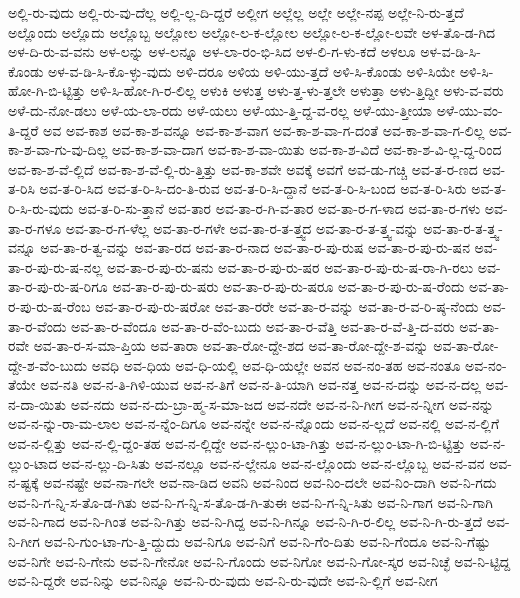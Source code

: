 {ಅಲ್ಲಿ-ರು-ವುದು
ಅಲ್ಲಿ-ರು-ವು-ದೆಲ್ಲ
ಅಲ್ಲಿ-ಲ್ಲ-ದಿ-ದ್ದರೆ
ಅಲ್ಲೀಗ
ಅಲ್ಲೆಲ್ಲ
ಅಲ್ಲೇ
ಅಲ್ಲೇ-ನಪ್ಪ
ಅಲ್ಲೇ-ನಿ-ರು-ತ್ತದೆ
ಅಲ್ಲೊಂದು
ಅಲ್ಲೊದು
ಅಲ್ಲೊಬ್ಬ
ಅಲ್ಲೋಲ
ಅಲ್ಲೋ-ಲ-ಕ-ಲ್ಲೋಲ
ಅಲ್ಲೋ-ಲ-ಕ-ಲ್ಲೋ-ಲವೇ
ಅಳ-ತೊ-ಡ-ಗಿದ
ಅಳ-ದಿ-ರು-ವ-ವನು
ಅಳ-ಲನ್ನು
ಅಳ-ಲನ್ನೂ
ಅಳ-ಲಾ-ರಂ-ಭಿ-ಸಿದ
ಅಳ-ಲಿ-ಗ-ಳು-ಕದೆ
ಅಳಲೂ
ಅಳ-ವ-ಡಿ-ಸಿ-ಕೊಂಡು
ಅಳ-ವ-ಡಿ-ಸಿ-ಕೊ-ಳ್ಳು-ವುದು
ಅಳಿ-ದರೂ
ಅಳಿಯ
ಅಳಿ-ಯು-ತ್ತದೆ
ಅಳಿ-ಸಿ-ಕೊಂಡು
ಅಳಿ-ಸಿಯೇ
ಅಳಿ-ಸಿ-ಹೋ-ಗಿ-ಬಿ-ಟ್ಟಿತ್ತು
ಅಳಿ-ಸಿ-ಹೋ-ಗಿ-ರ-ಲಿಲ್ಲ
ಅಳುಕಿ
ಅಳುತ್ತ
ಅಳು-ತ್ತ-ಳು-ತ್ತಲೇ
ಅಳುತ್ತಾ
ಅಳು-ತ್ತಿದ್ದೀ
ಅಳು-ವ-ವರು
ಅಳೆ-ದು-ನೋ-ಡಲು
ಅಳೆ-ಯ-ಲಾ-ರದು
ಅಳೆ-ಯಲು
ಅಳೆ-ಯು-ತ್ತಿ-ದ್ದ-ವ-ರಲ್ಲ
ಅಳೆ-ಯು-ತ್ತೀಯಾ
ಅಳೆ-ಯು-ವಂ-ತಿ-ದ್ದರೆ
ಅವ
ಅವ-ಕಾಶ
ಅವ-ಕಾ-ಶ-ವನ್ನೂ
ಅವ-ಕಾ-ಶ-ವಾಗ
ಅವ-ಕಾ-ಶ-ವಾ-ಗ-ದಂತೆ
ಅವ-ಕಾ-ಶ-ವಾ-ಗ-ಲಿಲ್ಲ
ಅವ-ಕಾ-ಶ-ವಾ-ಗು-ವು-ದಿಲ್ಲ
ಅವ-ಕಾ-ಶ-ವಾ-ದಾಗ
ಅವ-ಕಾ-ಶ-ವಾ-ಯಿತು
ಅವ-ಕಾ-ಶ-ವಿದೆ
ಅವ-ಕಾ-ಶ-ವಿ-ಲ್ಲ-ದ್ದ-ರಿಂದ
ಅವ-ಕಾ-ಶ-ವೆ-ಲ್ಲಿದೆ
ಅವ-ಕಾ-ಶ-ವೆ-ಲ್ಲಿ-ರು-ತ್ತಿತ್ತು
ಅವ-ಕಾ-ಶವೇ
ಅವಕ್ಕೆ
ಅವಗೆ
ಅವ-ಡು-ಗಚ್ಚಿ
ಅವ-ತ-ರ-ಣದ
ಅವ-ತ-ರಿಸಿ
ಅವ-ತ-ರಿ-ಸಿದ
ಅವ-ತ-ರಿ-ಸಿ-ದಂ-ತಿ-ರುವ
ಅವ-ತ-ರಿ-ಸಿ-ದ್ದಾನೆ
ಅವ-ತ-ರಿ-ಸಿ-ಬಂದ
ಅವ-ತ-ರಿ-ಸಿರು
ಅವ-ತ-ರಿ-ಸಿ-ರು-ವುದು
ಅವ-ತ-ರಿ-ಸು-ತ್ತಾನೆ
ಅವ-ತಾರ
ಅವ-ತಾ-ರ-ಗಿ-ವ-ತಾರ
ಅವ-ತಾ-ರ-ಗ-ಳಾದ
ಅವ-ತಾ-ರ-ಗಳು
ಅವ-ತಾ-ರ-ಗಳೂ
ಅವ-ತಾ-ರ-ಗ-ಳೆಲ್ಲ
ಅವ-ತಾ-ರ-ಗಳೇ
ಅವ-ತಾ-ರ-ತ-ತ್ತ್ವದ
ಅವ-ತಾ-ರ-ತ-ತ್ತ್ವ-ವನ್ನು
ಅವ-ತಾ-ರ-ತ-ತ್ತ್ವ-ವನ್ನೂ
ಅವ-ತಾ-ರ-ತ್ವ-ವನ್ನು
ಅವ-ತಾ-ರದ
ಅವ-ತಾ-ರ-ನಾದ
ಅವ-ತಾ-ರ-ಪು-ರುಷ
ಅವ-ತಾ-ರ-ಪು-ರು-ಷನ
ಅವ-ತಾ-ರ-ಪು-ರು-ಷ-ನಲ್ಲ
ಅವ-ತಾ-ರ-ಪು-ರು-ಷನು
ಅವ-ತಾ-ರ-ಪು-ರು-ಷರ
ಅವ-ತಾ-ರ-ಪು-ರು-ಷ-ರಾ-ಗಿ-ರಲು
ಅವ-ತಾ-ರ-ಪು-ರು-ಷ-ರಿಗೂ
ಅವ-ತಾ-ರ-ಪು-ರು-ಷರು
ಅವ-ತಾ-ರ-ಪು-ರು-ಷರೂ
ಅವ-ತಾ-ರ-ಪು-ರು-ಷ-ರೆಂದು
ಅವ-ತಾ-ರ-ಪು-ರು-ಷ-ರೆಂಬ
ಅವ-ತಾ-ರ-ಪು-ರು-ಷರೋ
ಅವ-ತಾ-ರರೇ
ಅವ-ತಾ-ರ-ವನ್ನು
ಅವ-ತಾ-ರ-ವ-ರಿ-ಷ್ಠ-ನೆಂದು
ಅವ-ತಾ-ರ-ವೆಂದು
ಅವ-ತಾ-ರ-ವೆಂದೂ
ಅವ-ತಾ-ರ-ವೆಂ-ಬುದು
ಅವ-ತಾ-ರ-ವೆತ್ತಿ
ಅವ-ತಾ-ರ-ವೆ-ತ್ತಿ-ದ-ವರು
ಅವ-ತಾ-ರವೇ
ಅವ-ತಾ-ರ-ಸ-ಮಾ-ಪ್ತಿಯ
ಅವ-ತಾರಾ
ಅವ-ತಾ-ರೋ-ದ್ದೇ-ಶದ
ಅವ-ತಾ-ರೋ-ದ್ದೇ-ಶ-ವನ್ನು
ಅವ-ತಾ-ರೋ-ದ್ದೇ-ಶ-ವೆಂ-ಬುದು
ಅವಧಿ
ಅವ-ಧಿಯ
ಅವ-ಧಿ-ಯಲ್ಲಿ
ಅವ-ಧಿ-ಯಲ್ಲೇ
ಅವನ
ಅವ-ನಂ-ತಹ
ಅವ-ನಂತೂ
ಅವ-ನಂ-ತೆಯೇ
ಅವ-ನತಿ
ಅವ-ನ-ತಿ-ಗಿಳಿ-ಯುವ
ಅವ-ನ-ತಿಗೆ
ಅವ-ನ-ತಿ-ಯಾಗಿ
ಅವ-ನತ್ತ
ಅವ-ನ-ದನ್ನು
ಅವ-ನ-ದಲ್ಲ
ಅವ-ನ-ದಾ-ಯಿತು
ಅವ-ನದು
ಅವ-ನ-ದು-ಬ್ರಾ-ಹ್ಮ-ಸ-ಮಾ-ಜದ
ಅವ-ನದೇ
ಅವ-ನ-ನಿ-ಗೀಗ
ಅವ-ನ-ನ್ನೀಗ
ಅವ-ನನ್ನು
ಅವ-ನ-ನ್ನು-ರಾ-ಮ-ಲಾಲ
ಅವ-ನ-ನ್ನೆಂ-ದಿಗೂ
ಅವ-ನನ್ನೇ
ಅವ-ನ-ನ್ನೊಂದು
ಅವ-ನ-ಲ್ಲದೆ
ಅವ-ನಲ್ಲಿ
ಅವ-ನ-ಲ್ಲಿಗೆ
ಅವ-ನ-ಲ್ಲಿತ್ತು
ಅವ-ನ-ಲ್ಲಿ-ದ್ದಂ-ತಹ
ಅವ-ನ-ಲ್ಲಿದ್ದೇ
ಅವ-ನ-ಲ್ಲುಂ-ಟಾ-ಗಿತ್ತು
ಅವ-ನ-ಲ್ಲುಂ-ಟಾ-ಗಿ-ಬಿ-ಟ್ಟಿತ್ತು
ಅವ-ನ-ಲ್ಲುಂ-ಟಾದ
ಅವ-ನ-ಲ್ಲು-ದಿ-ಸಿತು
ಅವ-ನಲ್ಲೂ
ಅವ-ನ-ಲ್ಲೇನೂ
ಅವ-ನ-ಲ್ಲೊಂದು
ಅವ-ನ-ಲ್ಲೊಬ್ಬ
ಅವ-ನ-ವನ
ಅವ-ನ-ಷ್ಟಕ್ಕೆ
ಅವ-ನಷ್ಟೇ
ಅವ-ನಾ-ಗಲೇ
ಅವ-ನಾ-ಡಿದ
ಅವನಿ
ಅವ-ನಿಂದ
ಅವ-ನಿಂ-ದಲೇ
ಅವ-ನಿಂ-ದಾಗಿ
ಅವ-ನಿ-ಗದು
ಅವ-ನಿ-ಗ-ನ್ನಿ-ಸ-ತೊ-ಡ-ಗಿತು
ಅವ-ನಿ-ಗ-ನ್ನಿ-ಸ-ತೊ-ಡ-ಗಿ-ತುಈ
ಅವ-ನಿ-ಗ-ನ್ನಿ-ಸಿತು
ಅವ-ನಿ-ಗಾಗ
ಅವ-ನಿ-ಗಾಗಿ
ಅವ-ನಿ-ಗಾದ
ಅವ-ನಿ-ಗಿಂತ
ಅವ-ನಿ-ಗಿತ್ತು
ಅವ-ನಿ-ಗಿದ್ದ
ಅವ-ನಿ-ಗಿನ್ನೂ
ಅವ-ನಿ-ಗಿ-ರ-ಲಿಲ್ಲ
ಅವ-ನಿ-ಗಿ-ರು-ತ್ತದೆ
ಅವ-ನಿ-ಗೀಗ
ಅವ-ನಿ-ಗುಂ-ಟಾ-ಗು-ತ್ತಿ-ದ್ದುದು
ಅವ-ನಿಗೂ
ಅವ-ನಿಗೆ
ಅವ-ನಿ-ಗೆಂ-ದಿತು
ಅವ-ನಿ-ಗೆಂದೂ
ಅವ-ನಿ-ಗೆಷ್ಟು
ಅವ-ನಿಗೇ
ಅವ-ನಿ-ಗೇನು
ಅವ-ನಿ-ಗೇನೋ
ಅವ-ನಿ-ಗೊಂದು
ಅವ-ನಿಗೋ
ಅವ-ನಿ-ಗೋ-ಸ್ಕರ
ಅವ-ನಿಚ್ಛೆ
ಅವ-ನಿ-ಟ್ಟಿದ್ದ
ಅವ-ನಿ-ದ್ದರೇ
ಅವ-ನಿನ್ನು
ಅವ-ನಿನ್ನೂ
ಅವ-ನಿ-ರು-ವುದು
ಅವ-ನಿ-ರು-ವುದೇ
ಅವ-ನಿ-ಲ್ಲಿಗೆ
ಅವ-ನೀಗ
}
